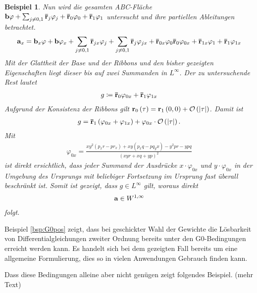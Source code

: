\documentclass[10pt,a4paper,oneside]{report}
\newtheorem{beispiel}{Beispiel}[chapter]
\begin{document}
\begin{beispiel}
Nun wird die gesamten ABC-Fläche $\bold{b} \varphi + \sum_{j\neq 0,1} \bold{\bar{r}}_j \varphi_j + \bold{\bar{r}}_0 \varphi_0 + \bold{\bar{r}}_1 \varphi_1$ untersucht und ihre partiellen Ableitungen betrachtet.
\begin{align*}
\bold{a}_x = \bold{b}_x \varphi + \bold{b} \varphi_x + \sum_{j\neq 0,1} \bold{\bar{r}}_{jx} \varphi_j + \sum_{j\neq 0,1} \bold{\bar{r}}_j \varphi_{jx} + \bold{\bar{r}}_{0x} \varphi_0 \bold{\bar{r}}_{0} \varphi_{0x}+ \bold{\bar{r}}_{1x} \varphi_1 + \bold{\bar{r}}_{1} \varphi_{1x} 
\end{align*}
Mit der Glattheit der Base und der Ribbons und den bisher gezeigten Eigenschaften liegt dieser bis auf zwei Summanden in $L^{\infty}$.
Der zu untersuchende Rest lautet
\begin{align*}
g \coloneqq \bold{\bar{r}}_{0} \varphi_{0x} + \bold{\bar{r}}_{1} \varphi_{1x}
\end{align*}
Aufgrund der Konsistenz der Ribbons gilt $\bold{r}_0 \left(\tau\right) = \bold{r}_1 \left(0,0\right) + \mathcal{O} \left( \left| \tau \right| \right)$.
Damit ist
\begin{align*}
g = \bold{\bar{r}}_{1} \left( \varphi_{0x} + \varphi_{1x} \right) + \varphi_{0x} \cdot \mathcal{O} \left( \left| \tau \right| \right).
\end{align*}
Mit  
\begin{align*}
\varphi_{0x} = \frac{x y^2 \left( p_xr- p r_x\right) + xy \left(p_x q -p q_yx\right) - y^2 pr - ypq}{\left(xy r + x q+ y p \right)^2}
\end{align*}
ist direkt ersichtlich, dass jeder Summand der Ausdrücke $x \cdot \varphi_{0x}$ und $y \cdot \varphi_{0x}$ in der Umgebung des Ursprungs mit beliebiger Fortsetzung im Ursprung fast überall beschränkt ist. 
Somit ist gezeigt, dass $g \in L^{\infty}$ gilt, woraus direkt
\begin{align*}
\bold{a} \in W^{1,\infty}
\end{align*}
folgt.
\end{beispiel}

Beispiel \ref{bsp:G0pos} zeigt, dass bei geschickter Wahl der Gewichte die Lösbarkeit von Differentialgleichungen zweiter Ordnung bereits unter den G0-Bedingungen erreicht werden kann.
Es handelt sich bei dem gezeigten Fall bereits um eine allgemeine Formulierung, dies so in vielen Anwendungen Gebrauch finden kann.

Dass diese Bedingungen alleine aber nicht genügen zeigt folgendes Beispiel.
(mehr Text)
\end{document}
